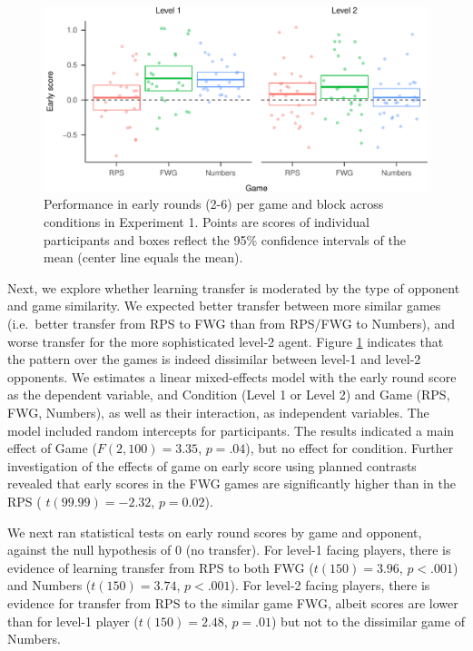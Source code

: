 \documentclass[
  english,
  man,floatsintext]{apa6}
\begin{document}
\begin{figure}

{\centering \includegraphics{paper_draft_2021_files/figure-latex/exp1-early-score-by-opp-1} 

}

\caption{\label{ref:figure4-caption}Performance in early rounds (2-6) per game and block across conditions in Experiment 1. Points are scores of individual participants and boxes reflect the 95\% confidence intervals of the mean (center line equals the mean).}\label{fig:exp1-early-score-by-opp}
\end{figure}

Next, we explore whether learning transfer is moderated by the type of opponent and game similarity. We expected better transfer between more similar games (i.e.~better transfer from RPS to FWG than from RPS/FWG to Numbers), and worse transfer for the more sophisticated level-2 agent. Figure \ref{fig:exp1-early-score-by-opp} indicates that the pattern over the games is indeed dissimilar between level-1 and level-2 opponents. We estimates a linear mixed-effects model with the early round score as the dependent variable, and Condition (Level 1 or Level 2) and Game (RPS, FWG, Numbers), as well as their interaction, as independent variables. The model included random intercepts for participants. The results indicated a main effect of Game (\(F(2,100) = 3.35\), \(p = .04\)), but no effect for condition. Further investigation of the effects of game on early score using planned contrasts revealed that early scores in the FWG games are significantly higher than in the RPS ( \(t(99.99) = -2.32\), \(p = 0.02\)).

We next ran statistical tests on early round scores by game and opponent, against the null hypothesis of 0 (no transfer). For level-1 facing players, there is evidence of learning transfer from RPS to both FWG (\(t(150) = 3.96\), \(p < .001\)) and Numbers (\(t(150) = 3.74\), \(p < .001\)). For level-2 facing players, there is evidence for transfer from RPS to the similar game FWG, albeit scores are lower than for level-1 player (\(t(150) = 2.48\), \(p = .01\)) but not to the dissimilar game of Numbers.
\end{document}
